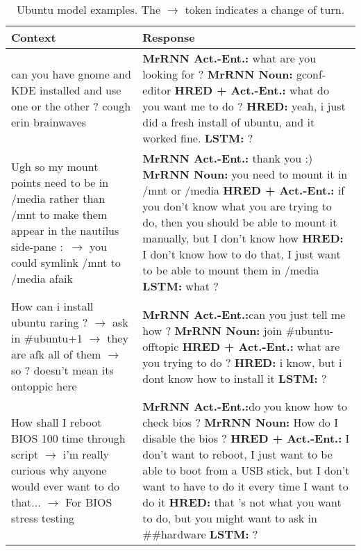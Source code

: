 \documentclass{article}
\begin{document}
\begin{table}[ht]
 \caption{Ubuntu model examples. The $\rightarrow$ token indicates a change of turn.}
 \label{table:ubuntu-examples-second}
 \scriptsize
 \centering
 \begin{tabular}{p{65mm}|p{60mm}}
 \textbf{Context} & \textbf{Response} \\ \hline
        can you have gnome and KDE installed and use one or the other ? cough erin brainwaves & \textbf{MrRNN Act.\@-Ent.:} what are you looking for ? \newline \textbf{MrRNN Noun:} gconf-editor \newline \textbf{HRED + Act.\@-Ent.\@:} what do you want me to do ? \newline \textbf{HRED:} yeah, i just did a fresh install of ubuntu, and it worked fine. \newline \textbf{LSTM:} ? \\ \hline 
        Ugh so my mount points need to be in /media rather than /mnt to make them appear in the nautilus side-pane :\ $\rightarrow$ you could symlink /mnt to /media afaik & \textbf{MrRNN Act.\@ -Ent.\@:} thank you :) \newline \textbf{MrRNN Noun:} you need to mount it in /mnt or /media \newline \textbf{HRED + Act.\@-Ent.\@:} if you don't know what you are trying to do, then you should be able to mount it manually, but I don't know how \newline \textbf{HRED:} I don't know how to do that, I just want to be able to mount them in /media \newline \textbf{LSTM:} what ? \\ \hline 
        How can i install ubuntu raring ? $\rightarrow$ ask in \#ubuntu+1 $\rightarrow$ they are afk all of them $\rightarrow$ so ? doesn't mean its ontoppic here & \textbf{MrRNN Act.\@ -Ent.\@:}can you just tell me how ? \newline \textbf{MrRNN Noun:} join \#ubuntu-offtopic \newline \textbf{HRED + Act.\@-Ent.\@:} what are you trying to do ? \newline \textbf{HRED:} i know, but i dont know how to install it \newline \textbf{LSTM:} ? \\ \hline 
        How shall I reboot BIOS 100 time through script $\rightarrow$ i'm really curious why anyone would ever want to do that... $\rightarrow$ For BIOS stress testing & \textbf{MrRNN Act.\@ -Ent.\@:}do you know how to check bios ? \newline \textbf{MrRNN Noun:} How do I disable the bios ? \newline \newline \textbf{HRED + Act.\@-Ent.\@:} I don't want to reboot, I just want to be able to boot from a USB stick, but I don't want to have to do it every time I want to do it \newline \textbf{HRED:} that 's not what you want to do, but you might want to ask in \#\#hardware \newline \textbf{LSTM:} ? \\ \hline 

\end{tabular}
\end{table}
\end{document}
